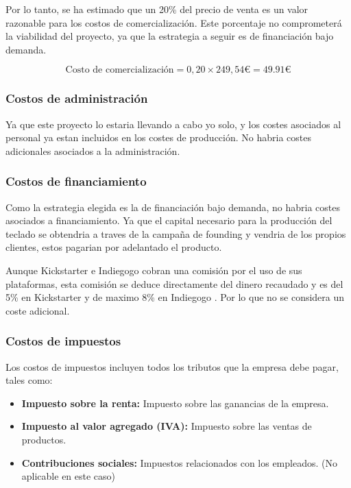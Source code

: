 Por lo tanto, se ha estimado que un 20\% del precio de venta es un valor razonable para los costos de comercialización. Este porcentaje no comprometerá la viabilidad del proyecto, ya que la estrategia a seguir es de financiación bajo demanda.

\begin{equation}
\text{Costo de comercialización} = 0,20 \times 249,54 \euro = 49.91 \euro
\end{equation}

\subsubsection{Costos de administración}
Ya que este proyecto lo estaria llevando a cabo yo solo, y los costes asociados al personal ya estan incluidos en los costes de producción. No habria costes adicionales asociados a la administración.

\subsubsection{Costos de financiamiento}
Como la estrategia elegida es la de financiación bajo demanda, no habria costes asociados a financiamiento. Ya que el capital necesario para la producción del teclado se obtendria a traves de la campaña de founding y vendria de los propios clientes, estos pagarian por adelantado el producto.

Aunque Kickstarter e Indiegogo cobran una comisión por el uso de sus plataformas, esta comisión se deduce directamente del dinero recaudado y es del 5\% en Kickstarter \cite{ComisionKickStarer} y de maximo 8\% en Indiegogo \cite{ComisionIndiegogo}. Por lo que no se considera un coste adicional.

\subsubsection{Costos de impuestos}

Los costos de impuestos incluyen todos los tributos que la empresa debe pagar, tales como:

\begin{itemize}
    \item \textbf{Impuesto sobre la renta:} Impuesto sobre las ganancias de la empresa.
    \item \textbf{Impuesto al valor agregado (IVA):} Impuesto sobre las ventas de productos.
    \item \textbf{Contribuciones sociales:} Impuestos relacionados con los empleados. (No aplicable en este caso)
\end{itemize}

